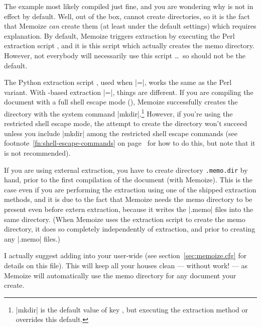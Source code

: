 \documentclass[a4paper,11pt]{article}
\begin{document}
\begin{tcolorbox}[title={Why is \refmmz[link color=white]{memo dir} not the default?}]
  The  example most likely compiled just fine, and you are
  wondering why  is not in effect by default.  Well, out of
  the box,  cannot create directories, so it is the fact that
  Memoize \emph{can} create them (at least under the default settings) which
  requires explanation.  By default, Memoize triggers extraction by executing
  the Perl extraction script , and it is this
  script which actually creates the memo directory.  However, not everybody
  will necessarily use this script \dots\ so  should not be
  the default.

  The Python extraction script , used when
  |=|, works the same as the Perl
  variant.  With -based extraction
  |=|, things are different.  If you are
  compiling the document with a full shell escape mode
  (), Memoize successfully creates the directory with the
  system command |mkdir|.\footnote{|mkdir| is the default value of key
    , but executing the extraction method
     or  overrides this default.}
  However, if you're using the restricted shell escape mode, the attempt to
  create the directory won't succeed unless you include |mkdir| among the
  restricted shell escape commands (see footnote~\ref{fn:shell-escape-commands}
  on page~\pageref{fn:shell-escape-commands} for how to do this, but note that
  it is not recommended).

  If you are using external extraction, you have to create directory
  \texttt{\examplename.memo.dir} by hand, prior to the first compilation of the
  document (with Memoize).  This is the case even if you are performing the
  extraction using one of the shipped extraction methods, and it is due to the
  fact that Memoize needs the memo directory to be present even before extern
  extraction, because it writes the |.memo| files into the same directory.
  (When Memoize uses the extraction script to create the memo directory, it
  does so completely independently of extraction, and prior to creating any
  |.memo| files.)
\end{tcolorbox}

I actually suggest adding  into your
user-wide  (see section~\ref{sec:memoize.cfg} for details
on this file).  This will keep all your houses clean --- without work! --- as
Memoize will automatically use the memo directory for any document your create.
\end{document}
